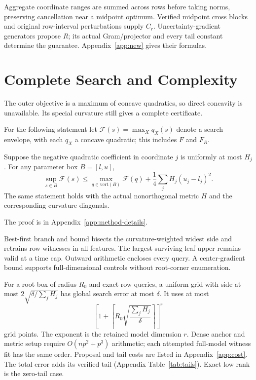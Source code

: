 Aggregate coordinate ranges are summed across rows before taking norms, preserving cancellation near a midpoint optimum. Verified midpoint cross blocks and original row-interval perturbations supply $C_r$. Uncertainty-gradient generators propose $R$; its actual Gram/projector and every tail constant determine the guarantee. Appendix~\ref{app:new} gives their formulas.

\section{Complete Search and Complexity}
The outer objective is a maximum of concave quadratics, so direct concavity is unavailable. Its special curvature still gives a complete certificate.

For the following statement let $\mathcal F(s)=\max_X q_X(s)$ denote a search envelope, with each $q_X$ a concave quadratic; this includes $F$ and $F_R$.

\begin{theorem}\label{thm:interp}
Suppose the negative quadratic coefficient in coordinate $j$ is uniformly at most $H_j$. For any parameter box $B=[l,u]$,
\begin{equation}
 \sup_{s\in B}\mathcal F(s)\leq
 \max_{q\in\mathrm{vert}(B)}\mathcal F(q)
      +\frac14\sum_jH_j(u_j-l_j)^2.\label{eq:interpolation}
\end{equation}
The same statement holds with the actual nonorthogonal metric $H$ and the corresponding curvature diagonals.
\end{theorem}
The proof is in Appendix~\ref{app:method-details}.


Best-first branch and bound bisects the curvature-weighted widest side and retrains row witnesses in all features. The largest surviving leaf upper remains valid at a time cap. Outward arithmetic encloses every query. A center-gradient bound supports full-dimensional controls without root-corner enumeration.

For a root box of radius $R_0$ and exact row queries, a uniform grid with side at most $2\sqrt{\delta/\sum_jH_j}$ has global search error at most $\delta$. It uses at most
\begin{equation}
 \left[1+\left\lceil R_0\sqrt{\frac{\sum_jH_j}{\delta}}\right\rceil\right]^r
\end{equation}
grid points. The exponent is the retained model dimension $r$. Dense anchor and metric setup require $O(np^2+p^3)$ arithmetic; each attempted full-model witness fit has the same order. Proposal and tail costs are listed in Appendix~\ref{app:cost}. The total error adds its verified tail (Appendix Table~\ref{tab:tails}). Exact low rank is the zero-tail case.


